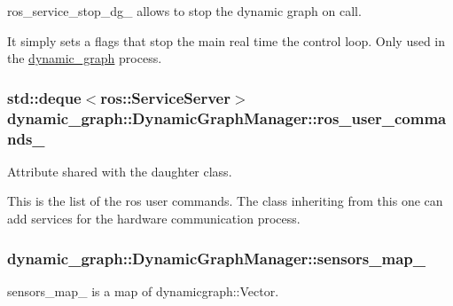 ros\+\_\+service\+\_\+stop\+\_\+dg\+\_\+ allows to stop the dynamic graph on call. 

It simply sets a flags that stop the main real time the control loop. Only used in the \hyperlink{namespacedynamic__graph}{dynamic\+\_\+graph} process. 
\subsubsection[{\texorpdfstring{ros\+\_\+user\+\_\+commands\+\_\+}{ros_user_commands_}}]{\setlength{\rightskip}{0pt plus 5cm}std\+::deque$<$ros\+::\+Service\+Server$>$ dynamic\+\_\+graph\+::\+Dynamic\+Graph\+Manager\+::ros\+\_\+user\+\_\+commands\+\_\+\hspace{0.3cm}{\ttfamily [protected]}}\hypertarget{classdynamic__graph_1_1DynamicGraphManager_a0fb35bc44f331db3570c09b75b49cd15}{}\label{classdynamic__graph_1_1DynamicGraphManager_a0fb35bc44f331db3570c09b75b49cd15}


Attribute shared with the daughter class. 

This is the list of the ros user commands. The class inheriting from this one can add services for the hardware communication process. 
\subsubsection[{\texorpdfstring{sensors\+\_\+map\+\_\+}{sensors_map_}}]{ dynamic\+\_\+graph\+::\+Dynamic\+Graph\+Manager\+::sensors\+\_\+map\+\_\+\hspace{0.3cm}{\ttfamily [protected]}}\hypertarget{classdynamic__graph_1_1DynamicGraphManager_a896bf6cb22d2d88a5a6a307a2e44608e}{}\label{classdynamic__graph_1_1DynamicGraphManager_a896bf6cb22d2d88a5a6a307a2e44608e}


sensors\+\_\+map\+\_\+ is a map of dynamicgraph\+::\+Vector. 

